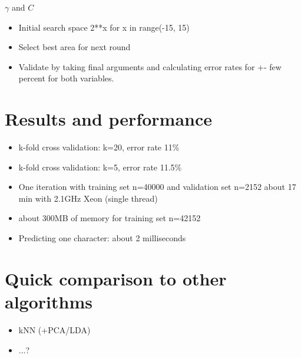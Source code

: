 \documentclass{netsec2012}
\begin{document}
$\gamma$ and $C$

\label{ref:crossvalidation}

\begin{itemize}
\item Initial search space 2**x for x in range(-15, 15)
\item Select best area for next round
\item Validate by taking final arguments and calculating error rates for +- few percent for both variables.
\end{itemize}

\section{Results and performance}

\label{ref:datachallenge}

\begin{itemize}
\item k-fold cross validation: k=20, error rate 11\%
\item k-fold cross validation: k=5, error rate 11.5\%
\item One iteration with training set n=40000 and validation set n=2152 about 17 min with 2.1GHz Xeon (single thread)
\item about 300MB of memory for training set n=42152
\item Predicting one character: about 2 milliseconds

\end{itemize}

\section{Quick comparison to other algorithms}

\begin{itemize}
\item kNN (+PCA/LDA)
\item ...?
\end{itemize}


\cite{albanese12mlpy}



\end{document}
